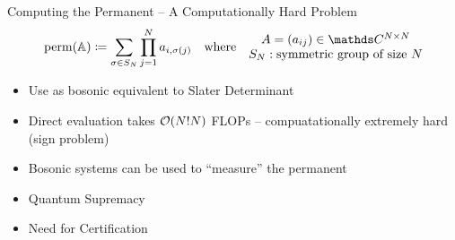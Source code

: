 
\begin{frame}[t,plain]
\titlepage
\end{frame}


\begin{frame}{Computing the Permanent -- A Computationally Hard Problem}
%
\begin{align*}
	\perm(\mathbb{A})
&\coloneqq
	\sum_{\sigma \in S_N} \prod_{j=1}^{N} a_{i, \sigma(j)}
&&
	\text{where}
&
	\mqty{
		A = (a_{ij}) \in \setComplex^{N \times N} \\
		S_N : \text{symmetric group of size } N \\
	}
\end{align*}
%
\begin{itemize}
\item Use as bosonic equivalent to Slater Determinant
\item Direct evaluation takes $\mathcal{O}(N!N)$ FLOPs -- compuatationally extremely hard\\
	(sign problem)
\item[\Thus] Bosonic systems can be used to \enquote{measure} the permanent
\item[\Thus] Quantum Supremacy
\item Need for Certification
\end{itemize}
%
\end{frame}


